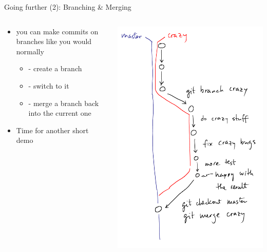 \begin{frame}{Going further (2): Branching \& Merging}
  \begin{columns}[onlytextwidth]
    \begin{column}{0.5\textwidth}
      \begin{itemize}
        \item you can make commits on branches like you would normally
        \begin{itemize}
          \item {} - create a branch
          \item {} - switch to it
          \item {} - merge a branch back into the current one
        \end{itemize}
        \item Time for another short demo
      \end{itemize}
    \end{column}
    \begin{column}{0.5\textwidth}
      \includegraphics[height=\textheight]{imgs/branches}
    \end{column}
  \end{columns}
\end{frame}


